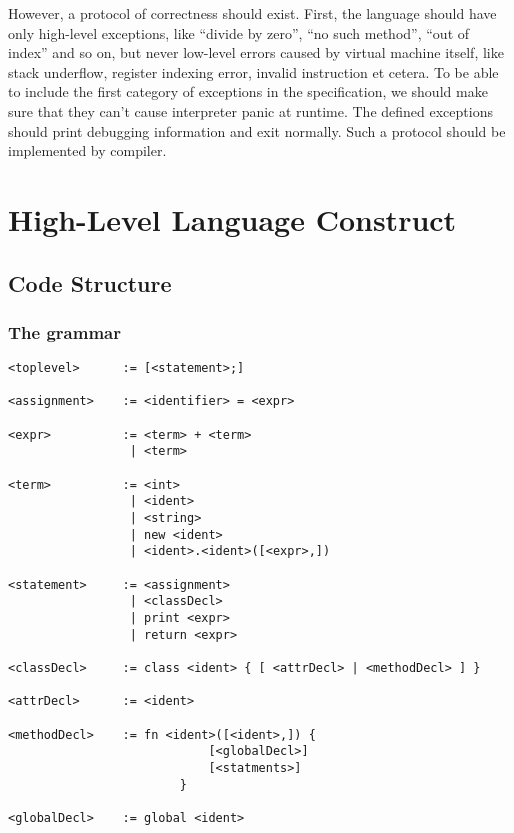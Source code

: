 \documentclass[]{article}
\numberwithin{equation}{section}
\numberwithin{figure}{section}
\numberwithin{table}{section}
\begin{document}
However, a protocol of correctness should exist. First, the language
should have only high-level exceptions, like ``divide by zero'', ``no
such method'', ``out of index'' and so on, but never low-level errors caused by
virtual machine itself, like stack underflow, register indexing error,
invalid instruction et cetera. To be able to include the first category of
exceptions in the specification, we should make sure that
they can't cause interpreter panic at runtime. The defined exceptions should
print debugging information and exit normally. Such a protocol should be implemented
by compiler.


\section{High-Level Language Construct}\label{high-level-language-construct}

\subsection{Code Structure}\label{code-structure}

\subsubsection{The grammar}\label{the-grammar}

\begin{verbatim}
<toplevel>      := [<statement>;]

<assignment>    := <identifier> = <expr>

<expr>          := <term> + <term>
                 | <term>

<term>          := <int>
                 | <ident>
                 | <string>
                 | new <ident>
                 | <ident>.<ident>([<expr>,])

<statement>     := <assignment>
                 | <classDecl>
                 | print <expr>
                 | return <expr>

<classDecl>     := class <ident> { [ <attrDecl> | <methodDecl> ] }

<attrDecl>      := <ident>

<methodDecl>    := fn <ident>([<ident>,]) {
                            [<globalDecl>]
                            [<statments>]
                        }

<globalDecl>    := global <ident>
\end{verbatim}
\end{document}
